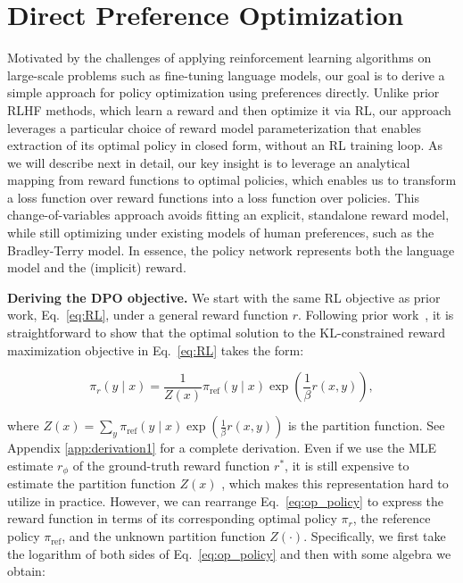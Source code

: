\section{Direct Preference Optimization}\label{sec:DPO}

Motivated by the challenges of applying reinforcement learning algorithms on large-scale problems such as fine-tuning language models, our goal is to derive a simple approach for policy optimization using preferences directly. Unlike prior RLHF methods, which learn a reward and then optimize it via RL, our approach {leverages a particular choice of reward model parameterization that enables extraction of its optimal policy in closed form, without an RL training loop}. As we will describe next in detail, our key insight is to leverage an analytical mapping from reward functions to optimal policies, which enables us to transform a loss function over reward functions into a loss function over policies. This change-of-variables approach {avoids fitting an explicit, standalone reward model}, while still optimizing under existing models of human preferences, such as the Bradley-Terry model. In essence, the policy network represents both the language model and the {(implicit)} reward.

\textbf{Deriving the DPO objective.} We start with the same RL objective as prior work, Eq.~\ref{eq:RL}, under a general reward function $r$. Following prior work~\citep{peters2007reinforcement, peng2019advantage, korbak2022reinforcement, go2023aligning}, it is straightforward to show that the optimal solution to the KL-constrained reward maximization objective in Eq.~\ref{eq:RL} takes the form:

\begin{equation}\label{eq:op_policy}
    \pi_r(y\mid x) = \frac{1}{Z(x)}\pi_\text{ref}(y\mid x)\exp\left(\frac{1}{\beta}r(x, y)\right),
\end{equation}

where $Z(x) =\sum_{y}\pi_\text{ref}(y\mid x)\exp\left(\frac{1}{\beta}r(x, y)\right)$ is the partition function. See Appendix \ref{app:derivation1} for a complete derivation. Even if we use the MLE estimate $r_{\phi}$ of the ground-truth reward function $r^*$, it is still expensive to estimate the partition function $Z(x)$ \citep{korbak2022reinforcement, go2023aligning}, which makes this representation hard to utilize in practice. However, we can rearrange Eq.~\ref{eq:op_policy} to express the reward function in terms of its corresponding optimal policy $\pi_r$, the reference policy $\pi_\text{ref}$, and the unknown partition function $Z(\cdot)$. Specifically, we first take the logarithm of both sides of Eq.~\ref{eq:op_policy} and then with some algebra we obtain:

